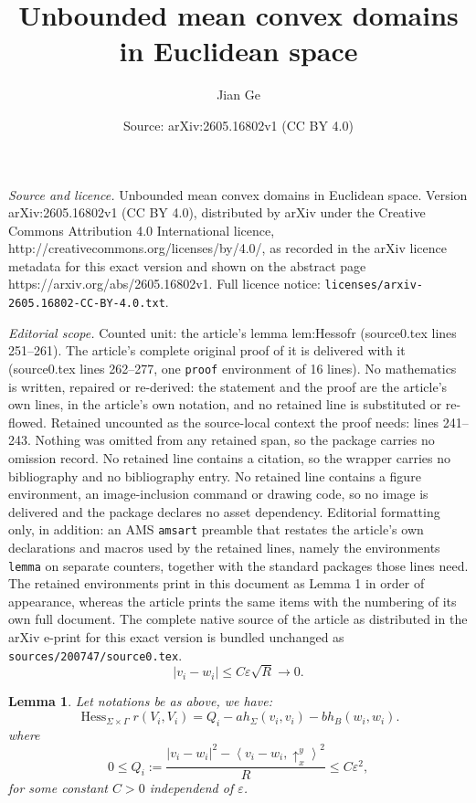 \documentclass[10pt,a4paper]{amsart}
\title{Unbounded mean convex domains in Euclidean space}
\author{Jian Ge}
\date{Source: arXiv:2605.16802v1 (CC BY 4.0)}
\newtheorem{lemma}{Lemma}
\begin{document}
\maketitle

\noindent\emph{Source and licence.} Unbounded mean convex domains in Euclidean space. Version arXiv:2605.16802v1 (CC BY 4.0), distributed by arXiv under the Creative Commons Attribution 4.0 International licence, http://creativecommons.org/licenses/by/4.0/, as recorded in the arXiv licence metadata for this exact version and shown on the abstract page https://arxiv.org/abs/2605.16802v1. Full licence notice: \texttt{licenses/arxiv-2605.16802-CC-BY-4.0.txt}.\par\smallskip

\noindent\textit{Editorial scope.} Counted unit: the article's lemma lem:Hessofr (source0.tex lines 251--261). The article's complete original proof of it is delivered with it (source0.tex lines 262--277, one \texttt{proof} environment of 16 lines). No mathematics is written, repaired or re-derived: the statement and the proof are the article's own lines, in the article's own notation, and no retained line is substituted or re-flowed.  Retained uncounted as the source-local context the proof needs: lines 241--243.  Nothing was omitted from any retained span, so the package carries no omission record.  No retained line contains a citation, so the wrapper carries no bibliography and no bibliography entry.  No retained line contains a figure environment, an image-inclusion command or drawing code, so no image is delivered and the package declares no asset dependency.  Editorial formatting only, in addition: an AMS \texttt{amsart} preamble that restates the article's own declarations and macros used by the retained lines, namely the environments \texttt{lemma} on separate counters, together with the standard packages those lines need.  The retained environments print in this document as Lemma 1 in order of appearance, whereas the article prints the same items with the numbering of its own full document.  The complete native source of the article as distributed in the arXiv e-print for this exact version is bundled unchanged as \texttt{sources/200747/source0.tex}.
\begin{equation}\label{eq:KEY}
	|v_{i}-w_{i}| \le C \varepsilon\sqrt{R}\to 0.
\end{equation}

\begin{lemma}\label{lem:Hessofr}
	Let notations be as above, we have:
	\[
		\operatorname{Hess}_{\Sigma\times\Gamma}r(V_i,V_i) = Q_{i} - a h_\Sigma(v_i, v_i)-b h_{B}(w_i, w_i).
	\]
	where
	\begin{equation}\label{eq:KEY01}
		0\le Q_{i}:= \frac{|v_{i}-w_{i}|^{2} - \left\langle v_{i}-w_{i}, \uparrow_{x}^{y} \right\rangle ^{2}}{R}\le C \varepsilon^{2},
	\end{equation}
	for some constant $C>0$ independend of $\varepsilon$.
\end{lemma}
\end{document}
